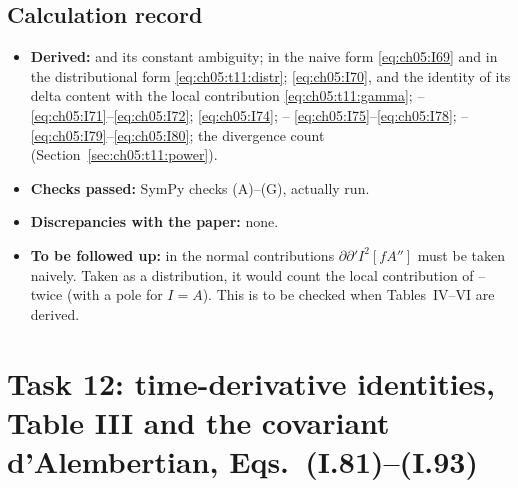 \subsection{Calculation record}
\begin{itemize}[leftmargin=14pt,itemsep=1pt]
\item \textbf{Derived:}  and its constant ambiguity;  in the naive form \eqref{eq:ch05:I69} and in the distributional form \eqref{eq:ch05:t11:distr};
 \eqref{eq:ch05:I70}, and the identity of its delta content with the local contribution \eqref{eq:ch05:t11:gamma};
-- \eqref{eq:ch05:I71}--\eqref{eq:ch05:I72};  \eqref{eq:ch05:I74}; -- \eqref{eq:ch05:I75}--\eqref{eq:ch05:I78};
-- \eqref{eq:ch05:I79}--\eqref{eq:ch05:I80}; the divergence count (Section~\ref{sec:ch05:t11:power}).
\item \textbf{Checks passed:} SymPy checks (A)--(G), actually run.
\item \textbf{Discrepancies with the paper:} none.
\item \textbf{To be followed up:} in the normal contributions $\partial\partial'I^2[fA'']$ must be taken naively. Taken as a distribution, it would count the local contribution of -- twice (with a pole for $I=A$).
This is to be checked when Tables~IV--VI are derived.
\end{itemize}

\section[Task 12: Eqs. (I.81)--(I.93) and Table III]{Task 12: time-derivative identities, Table III and the covariant d'Alembertian, Eqs.~(I.81)--(I.93)}
\label{sec:ch05:t12}

